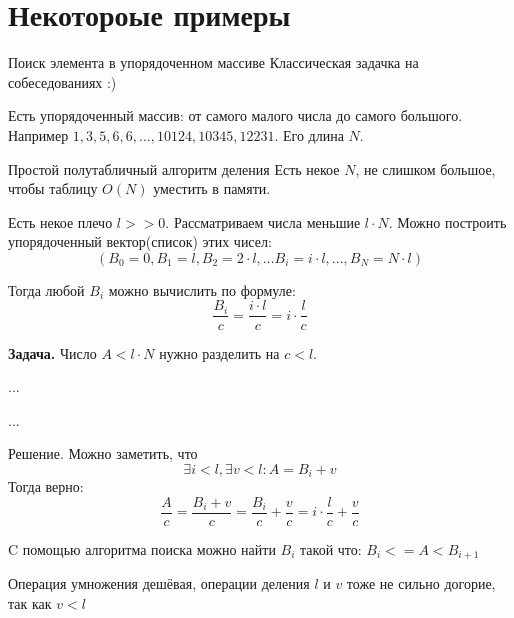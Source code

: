 \section{Некотороые примеры}\label{section:examples_1}

\begin{frame}{Поиск элемента в упорядоченном массиве}
	Классическая задачка на собеседованиях :)
	
	Есть упорядоченный массив: от самого малого числа до самого большого. 
	Например $1, 3, 5, 6, 6, ..., 10124, 10345, 12231$. 
	Его длина $N$.
	
	
	
\end{frame}


\begin{frame}{Простой полутабличный алгоритм деления}\label{frame:example_table_method}
	Есть некое $N$, не слишком большое, чтобы таблицу $O(N)$ уместить в памяти.
	
	Есть некое плечо $l>>0$. Рассматриваем числа меньшие $l \cdot N$. 
	Можно построить упорядоченный вектор(список) этих чисел:
	\begin{equation}\label{eq:example_table_method_vector_def}
	(B_0=0, B_1 = l, B_2 = 2 \cdot l, ... B_i = i \cdot l, ..., B_N = N \cdot l )
	\end{equation} 
	
	Тогда любой $B_i$ можно вычислить по формуле:
	\begin{equation}\label{eq:example_table_method_B_i}
	\frac{B_i}{c} = \frac{i \cdot l}{c} = i \cdot \frac{l}{c}
	\end{equation}
	
	
 
 	\textbf{Задача.} Число $A < l \cdot N$ нужно разделить на $c<l$.
	
	...
\end{frame}
\begin{frame}
 	...
 	
 	Решение. Можно заметить, что 
 	\begin{equation}
 	\exists i<l, \exists v<l: A = B_i+v
 	\end{equation}
 	Тогда верно:
 	\begin{equation}
 	\frac{A}{c} = \frac{B_i+v}{c} = \frac{B_i}{c} + \frac{v}{c} = i \cdot \frac{l}{c} + \frac{v}{c}
 	\end{equation}
 	
 	C помощью алгоритма поиска можно найти $B_i$ такой что: $B_i <= A < B_{i+1}$ %
 	
 	Операция умножения дешёвая, операции деления $l$ и $v$ тоже не сильно догорие, 
 	так как $v<l$
 	
 	
 
		
	
\end{frame}




